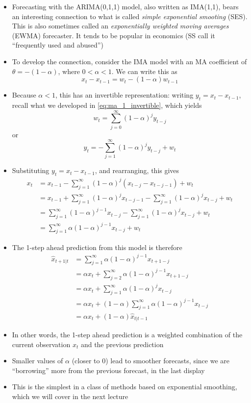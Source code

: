 \documentclass{article}
\begin{document}
\begin{itemize}
\item Forecasting with the ARIMA(0,1,1) model, also written as IMA(1,1), bears
  an interesting connection to what is called \emph{simple exponential 
    smooting} (SES). This is also sometimes called an \emph{exponentially
    weighted moving averages} (EWMA) forecaster. It tends to be popular in
  economics (SS call it ``frequently used and abused'')     

\item To develop the connection, consider the IMA model with an MA coefficient
  of $\theta = -(1-\alpha)$, where $0 < \alpha < 1$. We can write this as  
  \[
  x_t - x_{t-1} = w_t - (1-\alpha) w_{t-1}
  \]

\item Because $\alpha < 1$, this has an invertible representation: writing $y_t
  = x_t - x_{t-1}$, recall what we developed in \eqref{eq:ma_1_invertible},
  which yields 
  \[
  w_t = \sum_{j=0}^\infty (1-\alpha)^j y_{t-j} 
  \]
  or
  \[
  y_t = -\sum_{j=1}^\infty (1-\alpha)^j y_{t-j} + w_t
  \]
  
\item Substituting $y_t = x_t - x_{t-1}$, and rearranging, this gives 
  \begin{align*}
  x_t &= x_{t-1} - \sum_{j=1}^\infty (1-\alpha)^j (x_{t-j} - x_{t-j-1}) + w_t \\
  &= x_{t-1} + \sum_{j=1}^\infty (1-\alpha)^j x_{t-j-1} - \sum_{j=1}^\infty
    (1-\alpha)^j x_{t-j} + w_t \\
  &= \sum_{j=1}^\infty (1-\alpha)^{j-1} x_{t-j} - \sum_{j=1}^\infty (1-\alpha)^j
    x_{t-j} + w_t \\
  &= \sum_{j=1}^\infty \alpha (1-\alpha)^{j-1} x_{t-j} + w_t 
  \end{align*}

\item The 1-step ahead prediction from this model is therefore  
  \begin{align*}
  \hat{x}_{t+1 | t} &= \sum_{j=1}^\infty \alpha (1-\alpha)^{j-1} x_{t+1-j} \\  
  &= \alpha x_t + \sum_{j=2}^\infty \alpha (1-\alpha)^{j-1} x_{t+1-j} 
    \\
  &= \alpha x_t + \sum_{j=1}^\infty \alpha (1-\alpha)^j x_{t-j} \\
  &= \alpha x_t + (1-\alpha) \sum_{j=1}^\infty \alpha (1-\alpha)^{j-1}
    x_{t-j} \\
  &= \alpha x_t + (1-\alpha) \hat{x}_{t | t-1}
  \end{align*}

\item In other words, the 1-step ahead prediction is a weighted combination of
  the current observation $x_t$ and the previous prediction 

\item Smaller values of $\alpha$ (closer to 0) lead to smoother forecasts, since
  we are ``borrowing'' more from the previous forecast, in the last
  display

\item This is the simplest in a class of methods based on exponential smoothing,
  which we will cover in the next lecture
\end{itemize}
\end{document}
